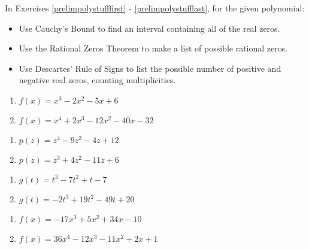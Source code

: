 \documentclass{ximera}
\begin{document}
	\author{Stitz-Zeager}


In Exercises \ref{prelimpolystufffirst} - \ref{prelimpolystufflast}, for the given polynomial:

\begin{itemize}
\item  Use Cauchy's Bound to find an interval containing all of the real zeros.
\item  Use the Rational Zeros Theorem to make a list of possible rational zeros.
\item  Use Descartes' Rule of Signs to list the possible number of positive and negative real zeros, counting multiplicities.
\end{itemize}


\begin{multicols}{2}
\begin{enumerate}

\item $f(x) = x^{3} - 2x^{2} - 5x + 6$ \label{prelimpolystufffirst}
\item $f(x) = x^{4} + 2x^{3} - 12x^{2} - 40x - 32$

\setcounter{HW}{\value{enumi}}
\end{enumerate}
\end{multicols}

\begin{multicols}{2}
\begin{enumerate}
\setcounter{enumi}{\value{HW}}

\item $p(z) = z^{4} - 9z^{2} - 4z + 12$
\item $p(z) = z^{3} + 4z^{2} - 11z + 6$

\setcounter{HW}{\value{enumi}}
\end{enumerate}
\end{multicols}

\begin{multicols}{2}
\begin{enumerate}
\setcounter{enumi}{\value{HW}}

\item $g(t) = t^{3} - 7t^{2} + t - 7$
\item $g(t) = -2t^{3} + 19t^{2} - 49t + 20$

\setcounter{HW}{\value{enumi}}
\end{enumerate}
\end{multicols}

\begin{multicols}{2}
\begin{enumerate}
\setcounter{enumi}{\value{HW}}

\item $f(x) = -17x^{3} + 5x^{2} + 34x - 10$
\item $f(x) = 36x^{4} - 12x^{3} - 11x^{2} + 2x + 1$

\setcounter{HW}{\value{enumi}}
\end{enumerate}
\end{multicols}
\end{document}
